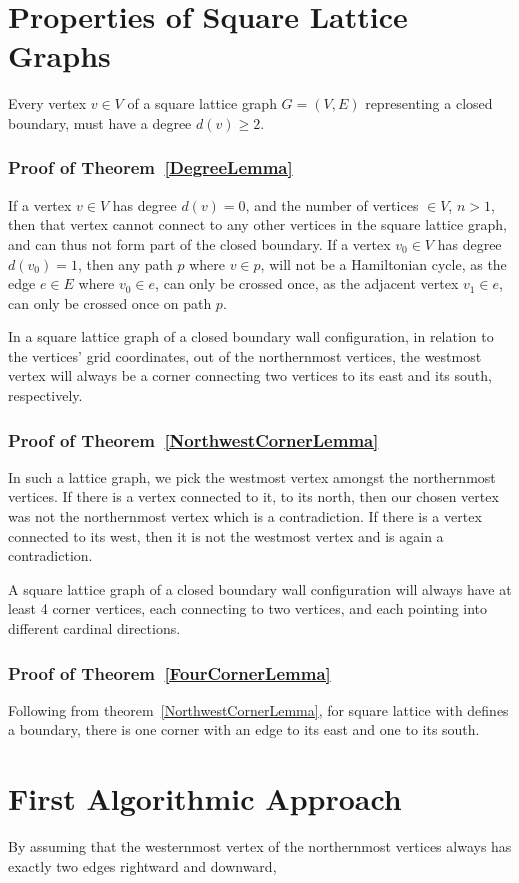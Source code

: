 \section{Properties of Square Lattice Graphs}
\begin{theorem}
Every vertex $v\in V$ of a square lattice graph $G=(V,E)$ representing a closed boundary, must have a degree $d(v)\geq 2$.\label{DegreeLemma}
\end{theorem}
\subsubsection*{Proof of Theorem~\ref{DegreeLemma}}
If a vertex $v\in V$ has degree $d(v)=0$, and the number of vertices $\in V$, $n>1$, then that vertex cannot connect to any other vertices in the square lattice graph, and can thus not form part of the closed boundary. If a vertex $v_0\in V$ has degree $d(v_0)=1$, then any path $p$ where $v\in p$, will not be a Hamiltonian cycle, as the edge $e\in E$ where $v_0\in e$, can only be crossed once, as the adjacent vertex $v_1\in e$, can only be crossed once on path $p$.
\begin{theorem}
In a square lattice graph of a closed boundary wall configuration, in relation to the vertices' grid coordinates, out of the northernmost vertices, the westmost vertex will always be a corner connecting two vertices to its east and its south, respectively.\label{NorthwestCornerLemma}
\end{theorem}
\subsubsection*{Proof of Theorem~\ref{NorthwestCornerLemma}}
In such a lattice graph, we pick the westmost vertex amongst the northernmost vertices. If there is a vertex connected to it, to its north, then our chosen vertex was not the northernmost vertex which is a contradiction. If there is a vertex connected to its west, then it is not the westmost vertex and is again a contradiction. 
\begin{theorem}
A square lattice graph of a closed boundary wall configuration will always have at least 4 corner vertices, each connecting to two vertices, and each pointing into different cardinal directions.\label{FourCornerLemma}
\end{theorem}
\subsubsection*{Proof of Theorem~\ref{FourCornerLemma}}
Following from theorem~\ref{NorthwestCornerLemma}, for square lattice with defines a boundary, there is one corner with an edge to its east and one to its south. 
\section{First Algorithmic Approach}
By assuming that the westernmost vertex of the northernmost vertices always has exactly two edges rightward and downward, 
